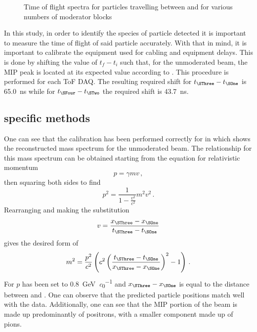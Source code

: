 \begin{figure}[h]
  \begin{adjustbox}{max totalsize={.8\linewidth}, center}
    
  \end{adjustbox}
  \caption[Time of flight spectra for particles travelling between \SOne and \SThree for various numbers of moderator blocks]{Time of flight spectra for particles travelling between \SOne and \SThree for various numbers of moderator blocks}
  \label{fig:s3Tof}
\end{figure}

In this study, in order to identify the species of particle detected it is important to measure the time of flight of said particle accurately.
With that in mind, it is important to calibrate the equipment used for cabling and equipment delays.
This is done by shifting the value of $t_{f}-t_{i}$ such that, for the unmoderated beam, the MIP peak is located at its expected value according to .
This procedure is performed for each ToF DAQ.
The resulting required shift for $t_{\SThree} - t_{\SOne}$ is \SI{65.0}{\nano\second} while for $t_{\SFour} - t_{\STwo}$ the required shift is \SI{43.7}{\nano\second}.

\subsection{\SThree specific methods}
\label{sec:hptpc_beam_flux:methods:s3}

One can see that the calibration has been performed correctly for \SThree in  which shows the reconstructed mass spectrum for the unmoderated beam.
The relationship for this mass spectrum can be obtained starting from the equation for relativistic momentum
\begin{equation}
p = \gamma m v \, ,
\end{equation}
then squaring both sides to find
\begin{equation}
p^{2} = \frac{1}{ 1 - \frac{v^{2}}{c^{2}} } m^{2} v^{2} \, .
\end{equation}
Rearranging and making the substitution
\begin{equation}
 v = \frac{x_{\SThree} - x_{\SOne}}{t_{\SThree} - t_{\SOne}} 
\end{equation}
gives the desired form of 
\begin{equation}
  m^{2} = \frac{p^{2}}{c^{2}} \left( c^{2} \left( \frac{t_{\SThree} - t_{\SOne}}{x_{\SThree} - x_{\SOne}} \right)^{2} - 1 \right) \, .
  \label{eq:massDistribution}
\end{equation}
For  $p$ has been set to \SI{0.8}{\giga\electronvolt\per\clight} and $x_{\SThree} - x_{\SOne}$ is equal to the distance between \SOne and \SThree.
One can observe that the predicted particle positions match well with the data.
Additionally, one can see that the MIP portion of the beam is made up predominantly of positrons, with a smaller component made up of pions.

